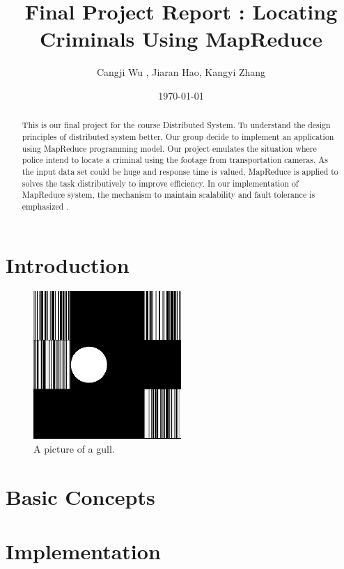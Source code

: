 \documentclass[12pt]{article}
\begin{document}
\title{Final Project Report : Locating Criminals Using MapReduce}
\author{Cangji Wu , Jiaran Hao, Kangyi Zhang}
\date{\today}
\maketitle

\begin{abstract}
This is our final project for the course Distributed System. To understand the design principles
of distributed system better, Our group decide to implement an application using MapReduce programming model. 
Our project emulates the situation where police intend to locate a criminal using the footage from transportation cameras. 
As the input data set could be huge and response time is valued, MapReduce is applied to solves the task distributively to
improve efficiency. In our implementation of MapReduce system, the mechanism to maintain scalability and fault tolerance is emphasized
. 
\end{abstract} 

\section {Introduction}
\begin{figure}[h!]
  
  \centering
    \includegraphics[width=0.5\textwidth]{1.jpg}
    \caption{A picture of a gull.}
\end{figure}

\section {Basic Concepts}


\section {Implementation}
\end{document}
